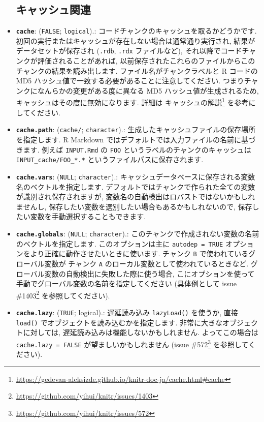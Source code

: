 \documentclass[
  11pt,
  lualatex,ja=standard,jafont=noto]{bxjsreport}
\renewcommand{\href}[2]{#2\footnote{\url{#1}}}
\begin{document}
\begin{itemize}
{  \subsection{キャッシュ関連}\label{cache-options}}
\item
  \textbf{\texttt{cache}}: (\texttt{FALSE}; \texttt{logical}).: コードチャンクのキャッシュを取るかどうかです. 初回の実行またはキャッシュが存在しない場合は通常通り実行され, 結果がデータセットが保存され (\texttt{.rdb}, \texttt{.rdx} ファイルなど), それ以降でコードチャンクが評価されることがあれば, 以前保存されたこれらのファイルからこのチャンクの結果を読み出します. ファイル名がチャンクラベルと R コードの MD5 ハッシュ値で一致する必要があることに注意してください. つまりチャンクになんらかの変更がある度に異なる MD5 ハッシュ値が生成されるため, キャッシュはその度に無効になります. 詳細は \href{https://gedevan-aleksizde.github.io/knitr-doc-ja/cache.html\#cache}{キャッシュの解説} を参考にしてください.
\item
  \textbf{\texttt{cache.path}}: (\texttt{\textquotesingle{}cache/\textquotesingle{}}; \texttt{character}).: 生成したキャッシュファイルの保存場所を指定します. R Markdown ではデフォルトでは入力ファイルの名前に基づきます. 例えば \texttt{INPUT.Rmd} の \texttt{FOO} というラベルのチャンクのキャッシュは \texttt{INPUT\_cache/FOO\_*.*} というファイルパスに保存されます.
\item
  \textbf{\texttt{cache.vars}}: (\texttt{NULL}; \texttt{character}).: キャッシュデータベースに保存される変数名のベクトルを指定します. デフォルトではチャンクで作られた全ての変数が識別され保存されますが, 変数名の自動検出はロバストではないかもしれませんし, 保存したい変数を選別したい場合もあるかもしれないので, 保存したい変数を手動選択することもできます.
\item
  \textbf{\texttt{cache.globals}}: (\texttt{NULL}; \texttt{character}).: このチャンクで作成されない変数の名前のベクトルを指定します. このオプションは主に \texttt{autodep = TRUE} オプションをより正確に動作させたいときに使います. チャンク \texttt{B} で使われているグローバル変数が チャンク \texttt{A} のローカル変数として使われているときなど. グローバル変数の自動検出に失敗した際に使う場合, こにオプションを使って手動でグローバル変数の名前を指定してください (具体例として issue \href{https://github.com/yihui/knitr/issues/1403}{\#1403} を参照してください).
\item
  \textbf{\texttt{cache.lazy}}: (\texttt{TRUE}; logical).: 遅延読み込み \texttt{lazyLoad()} を使うか, 直接 \texttt{load()} でオブジェクトを読み込むかを指定します. 非常に大きなオブジェクトに対しては, 遅延読み込みは機能しないかもしれません. よってこの場合は \texttt{cache.lazy = FALSE} が望ましいかもしれません (issue \href{https://github.com/yihui/knitr/issues/572}{\#572} を参照してください).

\end{itemize}
\end{document}

